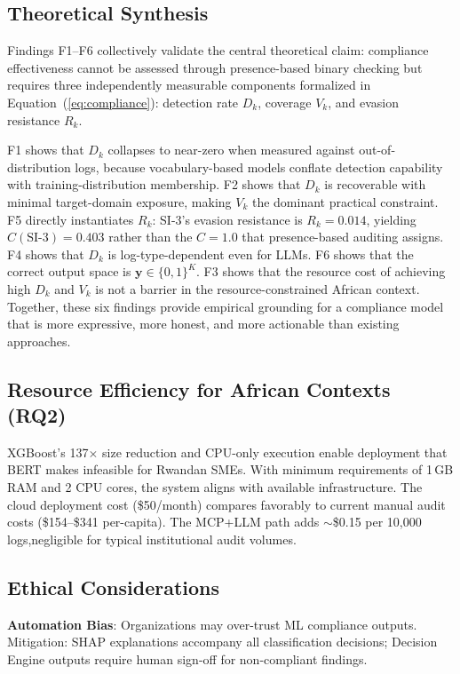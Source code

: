 \documentclass[futureinternet,article,submit,pdftex,moreauthors]{Definitions/mdpi}
\begin{document}
\subsection{Theoretical Synthesis}

Findings F1--F6 collectively validate the central theoretical claim: compliance effectiveness
cannot be assessed through presence-based binary checking but requires three independently
measurable components formalized in Equation~(\ref{eq:compliance}): detection rate $D_k$,
coverage $V_k$, and evasion resistance $R_k$.

F1 shows that $D_k$ collapses to near-zero when measured against out-of-distribution logs,
because vocabulary-based models conflate detection capability with training-distribution
membership. F2 shows that $D_k$ is recoverable with minimal target-domain exposure, making
$V_k$ the dominant practical constraint. F5 directly instantiates $R_k$: SI-3's evasion
resistance is $R_k = 0.014$, yielding $C(\text{SI-3}) = 0.403$ rather than the $C = 1.0$
that presence-based auditing assigns. F4 shows that $D_k$ is log-type-dependent even for
LLMs. F6 shows that the correct output space is $\mathbf{y} \in \{0,1\}^K$. F3 shows that
the resource cost of achieving high $D_k$ and $V_k$ is not a barrier in the
resource-constrained African context. Together, these six findings provide empirical grounding
for a compliance model that is more expressive, more honest, and more actionable than existing
approaches.

\subsection{Resource Efficiency for African Contexts (RQ2)}

XGBoost's 137$\times$ size reduction and CPU-only execution enable deployment that BERT
makes infeasible for Rwandan SMEs. With minimum requirements of 1\,GB RAM and 2 CPU cores,
the system aligns with available infrastructure. The cloud deployment cost (\$50/month)
compares favorably to current manual audit costs (\$154--\$341 per-capita). The MCP+LLM
path adds $\sim$\$0.15 per 10{,}000 logs,negligible for typical institutional audit volumes.

\subsection{Ethical Considerations}

\textbf{Automation Bias}: Organizations may over-trust ML compliance outputs. Mitigation:
SHAP explanations accompany all classification decisions; Decision Engine outputs require
human sign-off for non-compliant findings.
\end{document}
